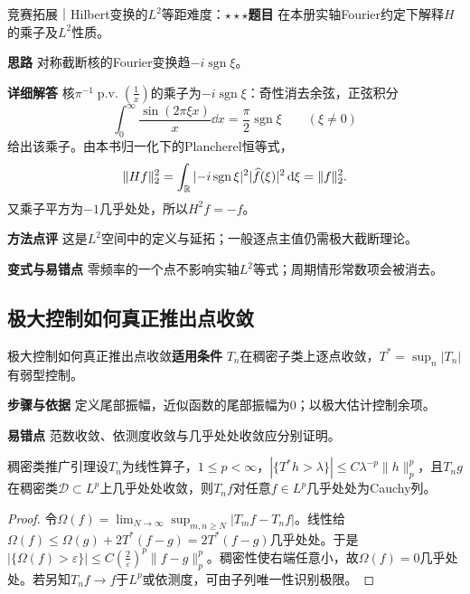 \begin{example}{竞赛拓展｜Hilbert变换的$L^2$等距}{难度：$\star\star\star$}\label{deep:ex:fourier_source_deep:l2hilbert}\textbf{题目} 在本册实轴Fourier约定下解释$H$的乘子及$L^2$性质。\par\textbf{思路} 对称截断核的Fourier变换趋$-i\operatorname{sgn}\xi$。\par\textbf{详细解答} 核$\pi^{-1}\operatorname{p.v.}(\frac{1}{x})$的乘子为$-i\operatorname{sgn}\xi$：奇性消去余弦，正弦积分
\[
\int_0^\infty\dfrac{\sin(2\pi\xi x)}x\dd x
=\dfrac\pi2\operatorname{sgn}\xi\qquad(\xi\ne0)
\]
给出该乘子。由本书归一化下的Plancherel恒等式，
\[
\|Hf\|_2^2
=\int_{\mathbb{R}}|{-i\operatorname{sgn}\xi}|^2|\widehat f(\xi)|^2\mathop{}\!\mathrm{d}\xi
=\|f\|_2^2.
\]又乘子平方为$-1$几乎处处，所以$H^2f=-f$。\par\textbf{方法点评} 这是$L^2$空间中的定义与延拓；一般逐点主值仍需极大截断理论。\par\textbf{变式与易错点} 零频率的一个点不影响实轴$L^2$等式；周期情形常数项会被消去。\end{example}

\subsection{极大控制如何真正推出点收敛}\label{deep:fourier_source_deep:density}

\begin{method}{极大控制如何真正推出点收敛}\textbf{适用条件} $T_n$在稠密子类上逐点收敛，$T^*=\sup_n|T_n|$有弱型控制。\par\textbf{步骤与依据} 定义尾部振幅，近似函数的尾部振幅为0；以极大估计控制余项。\par\textbf{易错点} 范数收敛、依测度收敛与几乎处处收敛应分别证明。\end{method}

\begin{theorem}{稠密类推广引理}设$T_n$为线性算子，$1\le p<\infty$，$|\{T^*h>\lambda\}|\le C\lambda^{-p}\|h\|_p^p$，且$T_n g$在稠密类$\mathcal D\subset L^p$上几乎处处收敛，则$T_nf$对任意$f\in L^p$几乎处处为Cauchy列。\end{theorem}\begin{proof}令$\Omega(f)=\lim_{N\to\infty}\sup_{m,n\ge N}|T_mf-T_nf|$。线性给$\Omega(f)\le\Omega(g)+2T^*(f-g)=2T^*(f-g)$几乎处处。于是$|\{\Omega(f)>\varepsilon\}|\le C(\frac{2}{\varepsilon})^p\|f-g\|_p^p$。稠密性使右端任意小，故$\Omega(f)=0$几乎处处。若另知$T_nf\to f$于$L^p$或依测度，可由子列唯一性识别极限。\end{proof}

